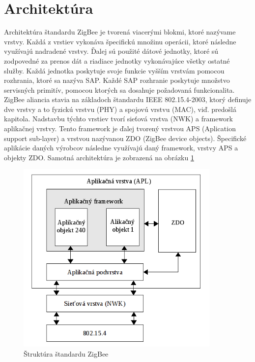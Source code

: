 \documentclass[11pt,twoside,a4paper]{book}
\begin{document}



\section{Architektúra}
Architektúra štandardu ZigBee je tvorená viacerými blokmi, ktoré nazývame vrstvy. Každá z vrstiev vykonáva špecifickú množinu operácii, ktoré následne využívajú nadradené vrstvy. Ďalej sú použité dátové jednotky, ktoré sú zodpovedné za prenos dát a riadiace jednotky vykonávajúce všetky ostatné služby. Každá jednotka poskytuje svoje funkcie vyšším vrstvám pomocou rozhrania, ktoré sa nazýva SAP. Každé SAP rozhranie poskytuje množstvo servisných primitív, pomocou ktorých sa dosahuje požadovaná funkcionalita.
ZigBee aliancia stavia na základoch štandardu IEEE 802.15.4-2003, ktorý definuje dve vrstvy a to fyzickú vrstvu (PHY) a spojovú vrstvu (MAC), viď. predošlá kapitola. Nadstavbu týchto vrstiev tvorí sieťová vrstva (NWK) a framework aplikačnej vrstvy. Tento framework je ďalej tvorený vrstvou APS (Aplication support sub-layer) a vrstvou nazývanou ZDO (ZigBee device objects). Špecifické aplikácie daných výrobcov následne využívajú daný framework, vrstvy APS a objekty ZDO. Samotná architektúra je zobrazená na obrázku \ref{fig:ZigBeeLayers}

\begin{figure}[h]
 \centering
 \includegraphics[width=10cm]{./figures/ZigBeeLayers.png}
 \caption{Štruktúra štandardu ZigBee}
 \label{fig:ZigBeeLayers}
\end{figure}
\end{document}
